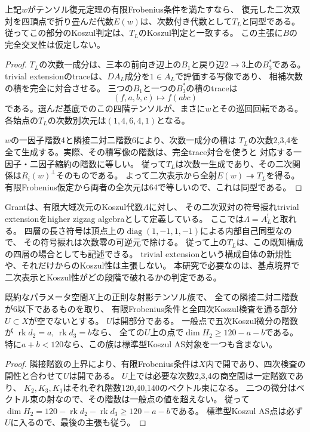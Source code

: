 \begin{proposition}
\label{prop:partial-symmetric-trivial-extension}
上記$w$がテンソル復元定理の有限Frobenius条件を満たすなら、
復元した二次双対を四頂点で折り畳んだ代数$E(w)$は、次数付き代数として$T_L$と同型である。
従ってこの部分のKoszul判定は、$T_L$のKoszul判定と一致する。
この主張に$B$の完全交叉性は仮定しない。
\end{proposition}
\begin{proof}
$T_L$の次数一成分は、三本の前向き辺上の$B_1$と戻り辺$2\to3$上の$B_3^*$である。
trivial extensionのtraceは、$D A_L$成分を$1\in A_L$で評価する写像であり、
相補次数の積を完全に対合させる。
三つの$B_1$と一つの$B_3^*$の積のtraceは
\[
 (f,a,b,c)\longmapsto f(abc)
\]
である。選んだ基底でのこの四階テンソルが、まさに$w$とその巡回回転である。
各始点の$T_L$の次数別次元は$(1,4,6,4,1)$となる。

$w$の一因子階数4と隣接二対二階数6により、次数一成分の積は
$T_L$の次数2,3,4を全て生成する。実際、その積写像の階数は、完全trace対合を使うと
対応する一因子・二因子縮約の階数に等しい。
従って$T_L$は次数一生成であり、その二次関係は$R_i(w)^\perp$そのものである。
よって二次表示から全射$E(w)\twoheadrightarrow T_L$を得る。
有限Frobenius仮定から両者の全次元は64で等しいので、これは同型である。
\end{proof}

\begin{remark}
Grant\cite[Definitions 2.3, 2.5]{GrantZigzag}は、有限大域次元のKoszul代数$\Lambda$に対し、
その二次双対の符号捩れtrivial extensionをhigher zigzag algebraとして定義している。
ここでは$\Lambda=A_L^!$と取れる。
四層の長さ符号は頂点上の$\operatorname{diag}(1,-1,1,-1)$による内部自己同型なので、
その符号捩れは次数零の可逆元で除ける。
従って上の$T_L$は、この既知構成の四層の場合としても記述できる。
trivial extensionという構成自体の新規性や、それだけからのKoszul性は主張しない。
本研究で必要なのは、基点境界で二次表示とKoszul性がどの段階で破れるかの判定である。
\end{remark}

\begin{lemma}[一般点の有限次数障害による族全体の排除]
\label{lem:generic-quintic-exclusion}
既約なパラメータ空間$X$上の正則な射影テンソル族で、
全ての隣接二対二階数が6以下であるものを取り、
有限Frobenius条件と全四次Koszul検査を通る部分$U\subset X$が空でないとする。
$U$は開部分である。
一般点で五次Koszul微分の階数が
$\operatorname{rk}d_2=a$, $\operatorname{rk}d_3=b$なら、
全ての$U$上の点で$\dim H_2\geq120-a-b$である。
特に$a+b<120$なら、この族は標準型Koszul AS対象を一つも含まない。
\end{lemma}
\begin{proof}
隣接階数の上界により、有限Frobenius条件は$X$内で開であり、四次検査の開性と合わせて$U$は開である。
$U$上では必要な次数2,3,4の商空間は一定階数であり、
$K_2,K_3,K_1$はそれぞれ階数120,40,140のベクトル束になる。
二つの微分はベクトル束の射なので、その階数は一般点の値を超えない。
従って
$\dim H_2=120-\operatorname{rk}d_2-\operatorname{rk}d_3\geq120-a-b$である。
標準型Koszul AS点は必ず$U$に入るので、最後の主張も従う。
\end{proof}

